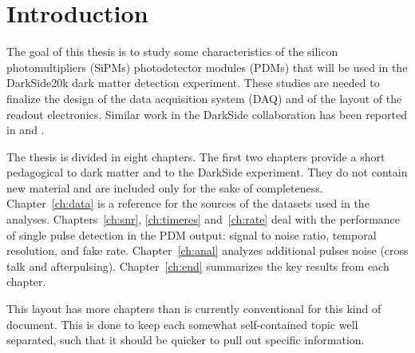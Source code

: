 \chapter*{Introduction}



The goal of this thesis is to study some characteristics of the silicon
photomultipliers (SiPMs) photodetector modules (PDMs) that will be used in the
DarkSide20k dark matter detection experiment. These studies are needed to
finalize the design of the data acquisition system (DAQ) and of the layout of
the readout electronics. Similar work in the DarkSide collaboration has been
reported in \cite[ch.~3, 5]{savarese2018} and \cite[ch.~5, 6]{luzzi2020}.



The thesis is divided in eight chapters. The first two chapters provide a short
pedagogical to dark matter and to the DarkSide experiment. They do not contain
new material and are included only for the sake of completeness.
Chapter~\ref{ch:data} is a reference for the sources of the datasets used in
the analyses. Chapters~\ref{ch:snr}, \ref{ch:timeres} and~\ref{ch:rate} deal
with the performance of single pulse detection in the PDM output: signal to
noise ratio, temporal resolution, and fake rate. Chapter~\ref{ch:anal} analyzes
additional pulses noise (cross talk and afterpulsing). Chapter~\ref{ch:end}
summarizes the key results from each chapter.


This layout has more chapters than is currently conventional for this kind of
document. This is done to keep each somewhat self-contained topic well
separated, such that it should be quicker to pull out specific information.

